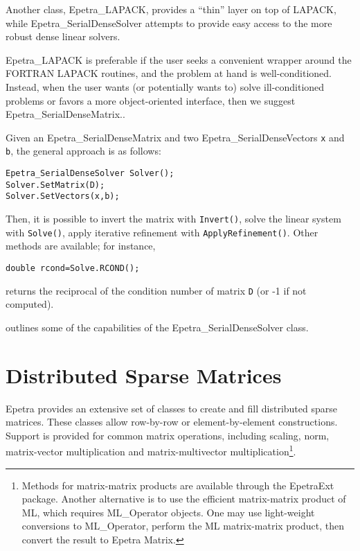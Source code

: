 Another class, Epetra\_LAPACK, provides a ``thin'' layer on
top of LAPACK, while Epetra\_SerialDenseSolver attempts to provide easy
access to the more robust dense linear solvers.

Epetra\_LAPACK is preferable if the user seeks a convenient wrapper
around the FORTRAN LAPACK routines, and the problem at hand is
well-conditioned. Instead, when the user wants (or potentially wants to)
solve ill-conditioned problems or favors a more object-oriented
interface, then we suggest Epetra\_SerialDenseMatrix..

\smallskip

Given an Epetra\_SerialDenseMatrix and two Epetra\_SerialDenseVectors
{\tt x} and {\tt b}, the general approach is as follows:
\begin{verbatim}
Epetra_SerialDenseSolver Solver();
Solver.SetMatrix(D);
Solver.SetVectors(x,b);
\end{verbatim}
Then, it is possible to invert the matrix with \verb!Invert()!, solve
the linear system with \verb!Solve()!, apply iterative refinement with
\verb!ApplyRefinement()!. Other methods are available; for instance,
\begin{verbatim}
double rcond=Solve.RCOND();
\end{verbatim}
returns the reciprocal of the condition number of matrix {\tt D} (or -1
if not computed).

 outlines some of the capabilities of the \newline
Epetra\_SerialDenseSolver class.


\section{Distributed Sparse Matrices}
\label{sec:sparse_mat}

Epetra provides an extensive set of classes to create and fill
distributed sparse matrices. These classes allow row-by-row or
element-by-element constructions. Support is provided for common matrix
operations, including scaling, norm, matrix-vector multiplication and
matrix-multivector multiplication\footnote{Methods for matrix-matrix
  products are available through the EpetraExt package. Another
  alternative is to use the efficient matrix-matrix product of ML, which
  requires ML\_Operator objects. One may use light-weight conversions to
  ML\_Operator, perform the ML matrix-matrix product, then convert the
  result to Epetra Matrix.}.

